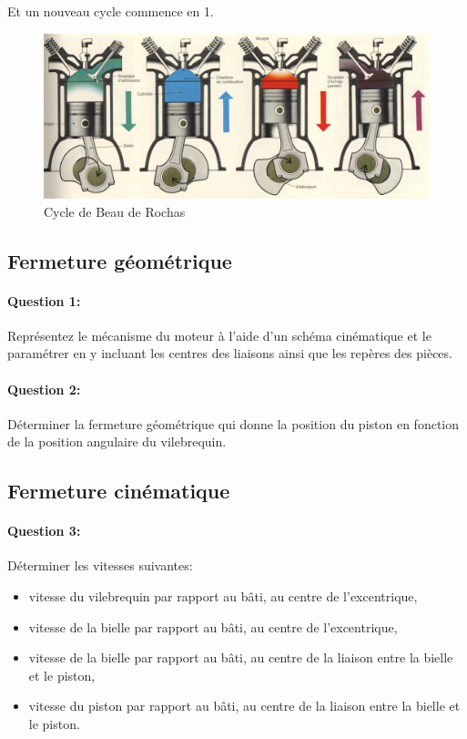 Et un nouveau cycle commence en 1.

\begin{figure}[htbp]
\begin{center}
 \includegraphics[width=\linewidth]{img/cycles.jpg}
\caption{Cycle de Beau de Rochas}
\label{fig:image9}
\end{center}
\end{figure}

\subsection{Fermeture géométrique}

\paragraph{Question 1:} Représentez le mécanisme du moteur à l'aide d'un schéma cinématique et le paramétrer en y incluant les centres des liaisons ainsi que les repères des pièces.

\paragraph{Question 2:} Déterminer la fermeture géométrique qui donne la position du piston en fonction de la position angulaire du vilebrequin.

\subsection{Fermeture cinématique}

\paragraph{Question 3:} Déterminer les vitesses suivantes:
\begin{itemize}
 \item vitesse du vilebrequin par rapport au bâti, au centre de l'excentrique,
 \item vitesse de la bielle par rapport au bâti, au centre de l'excentrique,
 \item vitesse de la bielle par rapport au bâti, au centre de la liaison entre la bielle et le piston,
 \item vitesse du piston par rapport au bâti, au centre de la liaison entre la bielle et le piston.
 \end{itemize}

